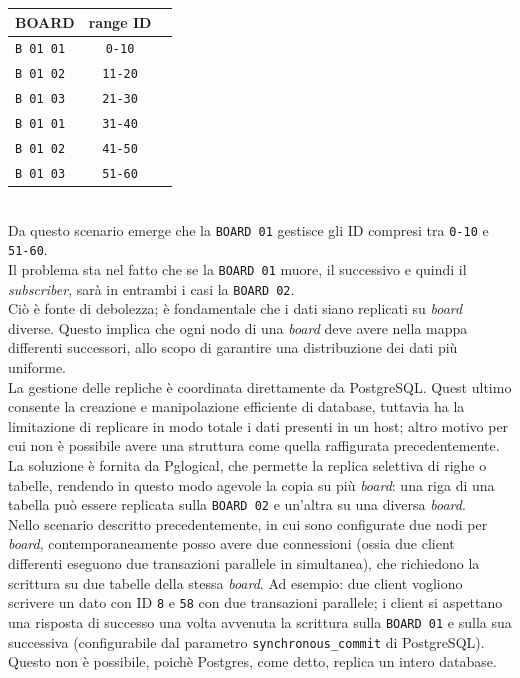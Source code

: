 \begin{center}
\begin{tabular}{ | l | c | r}
\hline
\textbf{BOARD} & \textbf{range ID}\\
\hline
\verb"B 01 01" & \verb"0-10"\\
\verb"B 01 02" & \verb"11-20"\\
\verb"B 01 03" & \verb"21-30"\\
\verb"B 01 01" & \verb"31-40"\\
\verb"B 01 02" & \verb"41-50"\\
\verb"B 01 03" & \verb"51-60"\\
\hline
\end{tabular}
\end{center}
\\

Da questo scenario emerge che la \verb"BOARD 01" gestisce gli ID compresi tra \verb"0-10" e \verb"51-60".\\
Il problema sta nel fatto che se la \verb"BOARD 01" muore, il successivo e quindi il \textit{subscriber}, sar\`{a} in entrambi i casi la \verb"BOARD 02".\\
Ci\`{o} \`{e} fonte di debolezza; \`{e} fondamentale che i dati siano replicati su \textit{board} diverse. Questo implica che ogni nodo di una \textit{board} deve avere nella mappa differenti successori, allo scopo di garantire una distribuzione dei dati pi\`{u} uniforme.\\

La gestione delle repliche \`{e} coordinata direttamente da PostgreSQL.
Quest ultimo consente la creazione e manipolazione efficiente di database, tuttavia ha la limitazione di replicare in modo totale i dati presenti in un host; altro motivo per cui non \`{e} possibile avere una struttura come quella raffigurata precedentemente.\\
La soluzione \`{e} fornita da Pglogical, che permette la replica selettiva di righe o tabelle, rendendo in questo modo agevole la copia su pi\`{u} \textit{board}: una riga di una tabella pu\`{o} essere replicata sulla \verb"BOARD 02" e un'altra su una diversa \textit{board}.\\

Nello scenario descritto precedentemente, in cui sono configurate due nodi per \textit{board}, contemporaneamente posso avere due connessioni (ossia due client differenti eseguono due transazioni parallele in simultanea), che richiedono la scrittura su due tabelle della stessa \textit{board}. Ad esempio: due client vogliono scrivere un dato con ID \verb"8" e \verb"58" con due transazioni parallele; i client si aspettano una risposta di successo una volta avvenuta la scrittura sulla \verb"BOARD 01" e sulla sua successiva (configurabile dal parametro \verb"synchronous_commit" di PostgreSQL). Questo non \`{e} possibile, poich\`{e} Postgres, come detto, replica un intero database.

